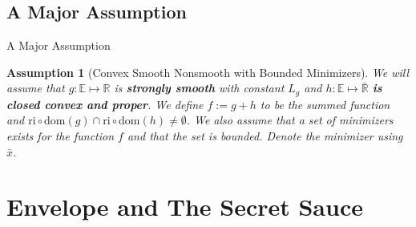 \documentclass[11pt]{beamer}
\newtheorem{assumption}{Assumption}
\begin{document}
    \subsection{A Major Assumption}    
        \begin{frame}{A Major Assumption}
            \begin{assumption}[Convex Smooth Nonsmooth with Bounded Minimizers]\label{assumption:1}
                We will assume that $g:\mathbb E\mapsto \mathbb R$ is \textbf{strongly smooth} with constant $L_g$ and $h:\mathbb E \mapsto \bar{\mathbb R}$ \textbf{is closed convex and proper}. We define $f := g + h$ to be the summed function and $\text{ri}\circ \text{dom}(g) \cap \text{ri}\circ \text{dom}(h) \neq \emptyset$. We also assume that a set of minimizers exists for the function $f$ and that the set is bounded. Denote the minimizer using $\bar x$. 
            \end{assumption}
        \end{frame}
        
    
\section{Envelope and The Secret Sauce}
\end{document}
